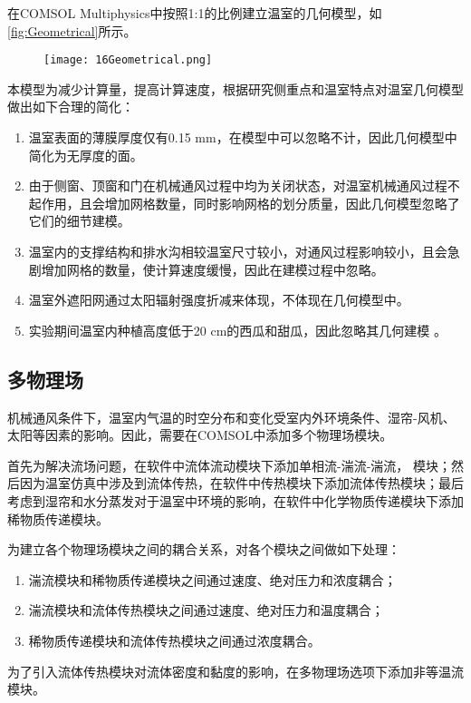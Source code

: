 在COMSOL Multiphysics中按照1:1的比例建立温室的几何模型，如\ref{fig:Geometrical}所示。
	\begin{figure}[!htbp]
		\centering
		\texttt{[image: 16Geometrical.png]}
	\end{figure}
本模型为减少计算量，提高计算速度，根据研究侧重点和温室特点对温室几何模型做出如下合理的简化：
	\begin{enumerate}
		\item 温室表面的薄膜厚度仅有0.15 mm，在模型中可以忽略不计，因此几何模型中简化为无厚度的面。
		\item 由于侧窗、顶窗和门在机械通风过程中均为关闭状态，对温室机械通风过程不起作用，且会增加网格数量，同时影响网格的划分质量，因此几何模型忽略了它们的细节建模。
		\item 温室内的支撑结构和排水沟相较温室尺寸较小，对通风过程影响较小，且会急剧增加网格的数量，使计算速度缓慢，因此在建模过程中忽略。
		\item 温室外遮阳网通过太阳辐射强度折减来体现，不体现在几何模型中。
		\item 实验期间温室内种植高度低于20 cm的西瓜和甜瓜，因此忽略其几何建模\supercite{HeKeshi2012,RenShougang2015} 。
	\end{enumerate}
	
	\subsection{多物理场}
	机械通风条件下，温室内气温的时空分布和变化受室内外环境条件、湿帘-风机、太阳等因素的影响。因此，需要在COMSOL中添加多个物理场模块。
	
首先为解决流场问题，在软件中流体流动模块下添加单相流-湍流-湍流， 模块；然后因为温室仿真中涉及到流体传热，在软件中传热模块下添加流体传热模块；最后考虑到湿帘和水分蒸发对于温室中环境的影响，在软件中化学物质传递模块下添加稀物质传递模块。

为建立各个物理场模块之间的耦合关系，对各个模块之间做如下处理：
	\begin{enumerate}
		\item 湍流模块和稀物质传递模块之间通过速度、绝对压力和浓度耦合；
		\item 湍流模块和流体传热模块之间通过速度、绝对压力和温度耦合；
		\item 稀物质传递模块和流体传热模块之间通过浓度耦合。
	\end{enumerate}
为了引入流体传热模块对流体密度和黏度的影响，在多物理场选项下添加非等温流模块。

